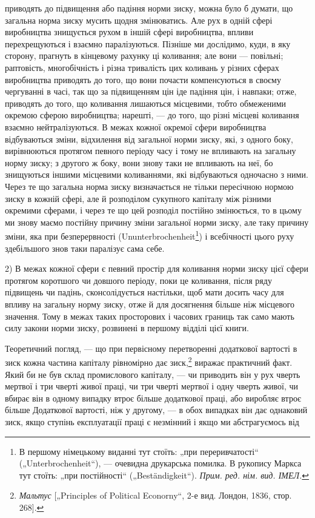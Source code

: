 \parcont{}  %
приводять до підвищення або падіння норми зиску, можна було б думати, що загальна норма зиску мусить
щодня змінюватись. Але рух в одній сфері виробництва знищується рухом в іншій сфері виробництва,
впливи перехрещуються і взаємно
паралізуються. Пізніше ми дослідимо, куди, в яку сторону, прагнуть в кінцевому рахунку ці коливання;
але вони — повільні;
раптовість, многобічність і різна тривалість цих коливань у
різних сферах виробництва приводять до того, що вони почасти компенсуються в своєму чергуванні в
часі, так що за
підвищенням цін іде падіння цін, і навпаки; отже, приводять до того, що коливання лишаються
місцевими, тобто обмеженими окремою сферою виробництва; нарешті, — до того, що різні місцеві
коливання взаємно нейтралізуються. В межах кожної окремої сфери виробництва відбуваються зміни,
відхилення
від загальної норми зиску, які, з одного боку, вирівнюються
протягом певного періоду часу і тому не впливають на загальну
норму зиску; з другого ж боку, вони знову таки не впливають
на неї, бо знищуються іншими місцевими коливаннями, які відбуваються одночасно з ними. Через те що
загальна норма зиску
визначається не тільки пересічною нормою зиску в кожній сфері,
але й розподілом сукупного капіталу між різними окремими
сферами, і через те що цей розподіл постійно змінюється, то
в цьому ми знову маємо постійну причину зміни загальної норми
зиску, але таку причину зміни, яка при безперервності (Ununterbrochenheit\footnote*{
В першому німецькому виданні тут стоїть: „при переривчатості“ („Unterbrochenheit“), — очевидна
друкарська помилка. В рукопису Маркса тут стоїть:
„при постійності“ („Beständigkeit“). \emph{Прим. ред. нім. вид. ІМЕЛ.}
}) і всебічності цього руху
здебільшого знов таки
паралізує сама себе.

2) В межах кожної сфери є певний простір для коливання
норми зиску цієї сфери протягом коротшого чи довшого періоду, поки це коливання, після ряду
підвищень чи падінь,
сконсолідується настільки, щоб мати досить часу для впливу
на загальну норму зиску, отже й для досягнення більше ніж
місцевого значення. Тому в межах таких просторових і часових границь так само мають силу закони
норми зиску, розвинені в першому відділі цієї книги.

Теоретичний погляд, — що при первісному перетворенні додаткової вартості в зиск кожна частина
капіталу рівномірно
дає зиск,\footnote{
\emph{Мальтус} [„Principles of Political Econorny“, 2-е вид. Лондон, 1836, стор. 268].
} виражає практичний факт. Який би не був склад промислового капіталу, — чи приводить він
у рух чверть мертвої
і три чверті живої праці, чи три чверті мертвої і одну чверть
живої, чи вбирає він в одному випадку втроє більше додаткової
праці, або виробляє втроє більше Додаткової вартості, ніж у другому, — в обох випадках він дає
однаковий зиск, якщо ступінь
експлуатації праці є незмінний і якщо ми абстрагуємось від
\parbreak{}  %
